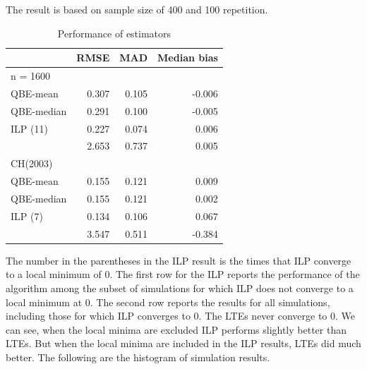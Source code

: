 \documentclass[12pt]{article}
\theoremstyle{plain} \newtheorem{theorem}{Theorem}
\theoremstyle{definition} \newtheorem{definition}{Definition}
\begin{document}
The result is based on sample size of 400 and 100 repetition.

\begin{table}[H]
        \centering
        \begin{tabular}{lrrr}
          \hline
                     & RMSE   & MAD  & Median bias \\ \hline
          n = 1600   &       &       &  \\
          QBE-mean   & 0.307 & 0.105 & -0.006     \\
          QBE-median & 0.291 & 0.100 & -0.005    \\
          ILP (11)   & 0.227 & 0.074 &  0.006    \\
                     & 2.653 & 0.737 &  0.005    \\
          \hline
          CH(2003)   &       &       &  \\
          QBE-mean   & 0.155 & 0.121 &  0.009    \\
          QBE-median & 0.155 & 0.121 &  0.002    \\
          ILP (7)    & 0.134 & 0.106 &  0.067    \\
                     & 3.547 & 0.511 & -0.384    \\
          \hline
        \end{tabular}
        \caption{Performance of estimators}
\end{table}

The number in the parentheses in the ILP result is the times that ILP converge to a local minimum of 0. The first row for the ILP reports the performance of the algorithm among the subset of simulations for which ILP does not converge to a local minimum at 0. The second row reports the results for all simulations, including those for which ILP converges to 0. The LTEs never converge to 0. We can see, when the local minima are excluded ILP performs slightly better than LTEs. But when the local minima are included in the ILP results, LTEs did much better. The following are the histogram of simulation results.
\end{document}
